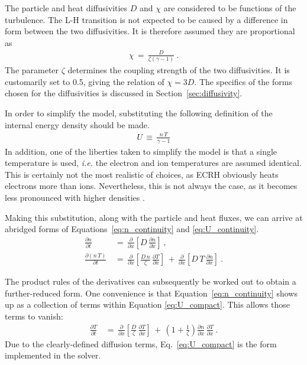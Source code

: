 The particle and heat diffusivities $D$ and $\chi$ are considered to be functions of the turbulence.
The L-H transition is not expected to be caused by a difference in form between the two diffusivities.
It is therefore assumed they are proportional as 
\begin{align} %
	\chi \,=\, \frac{D}{\zeta (\gamma - 1)} \label{eq:heat_particle_diff_relation}~.
\end{align}
The parameter $\zeta$ determines the coupling strength of the two diffusivities.
It is customarily set to 0.5, giving the relation of $\chi = 3 D$.
The specifics of the forms chosen for the diffusivities is discussed in Section~\ref{sec:diffusivity}.

In order to simplify the model, substituting the following definition of the internal energy density should be made.
\begin{align} %
	U \,\equiv\, \frac{n \, T}{\gamma - 1} \label{eq:U_definition}
\end{align}
In addition, one of the liberties taken to simplify the model is that a single temperature is used, \emph{i.e.} the electron and ion temperatures are assumed identical.
This is certainly not the most realistic of choices, as ECRH obviously heats electrons more than ions.
Nevertheless, this is not always the case, as it becomes less pronounced with higher densities \cite{sauter_l--_2012}.

Making this substitution, along with the particle and heat fluxes, we can arrive at abridged forms of Equations~\ref{eq:n_continuity} and \ref{eq:U_continuity}.
\begin{align} %
	\frac{\partial n}{\partial t} \,&=\, \frac{\partial}{\partial x} \left[D \,
		\frac{\partial n}{\partial x}\right]~,\label{eq:n_compact} \\
	\frac{\partial(n\,T)}{\partial t} \,&=\, \frac{\partial}{\partial x}
		\left[\frac{D\,n}{\zeta} \, \frac{\partial T}{\partial x}\right]
		\,+\, \frac{\partial}{\partial x} \left[D\,T \,
		\frac{\partial n}{\partial x}\right]~. \label{eq:U_compact}
\end{align}

The product rules of the derivatives can subsequently be worked out to obtain a further-reduced form.
One convenience is that Equation~\ref{eq:n_continuity} shows up as a collection of terms within Equation \ref{eq:U_compact}.
This allows those terms to vanish:
\begin{align} %
	\frac{\partial T}{\partial t} \,&=\, \frac{\partial}{\partial x}
		\left[\frac{D}{\zeta} \, \frac{\partial T}{\partial x}\right] \,+\,
		\left(1 + \frac{1}{\zeta}\right) \frac{\partial n}{\partial x} \,
		\frac{\partial T}{\partial x}~. \label{eq:T_compact}
\end{align}
Due to the clearly-defined diffusion terms, Eq.~\ref{eq:U_compact} is the form implemented in the solver.

